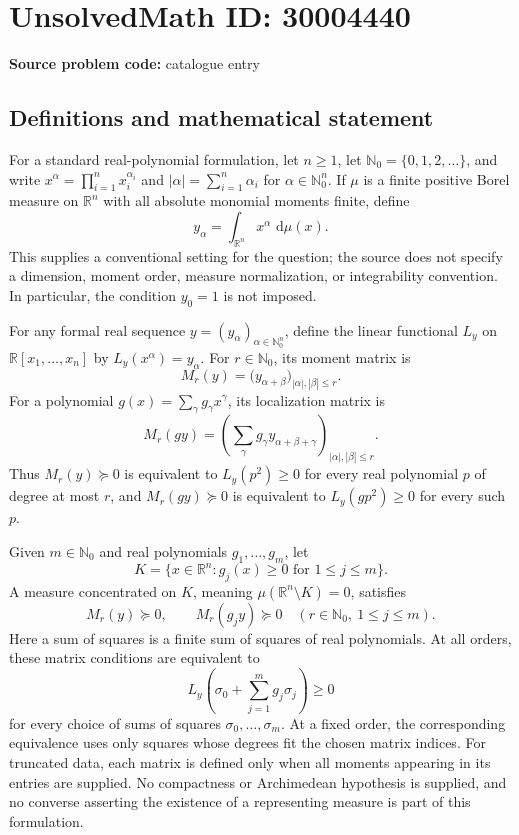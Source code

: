 \documentclass[11pt]{article}
\newcommand{\N}{\mathbb{N}}
\newcommand{\R}{\mathbb{R}}
\newcommand{\dd}{\,\mathrm{d}}
\begin{document}
\section*{UnsolvedMath ID: 30004440}
\textbf{Source problem code:} catalogue entry
\subsection{Definitions and mathematical statement}
For a standard real-polynomial formulation, let \(n\geq 1\), let \(\N_0=\{0,1,2,\ldots\}\), and write \(x^\alpha=\prod_{i=1}^n x_i^{\alpha_i}\) and \(|\alpha|=\sum_{i=1}^n\alpha_i\) for \(\alpha\in\N_0^n\). If \(\mu\) is a finite positive Borel measure on \(\R^n\) with all absolute monomial moments finite, define
\[
y_\alpha=\int_{\R^n}x^\alpha\,\dd\mu(x).
\]
This supplies a conventional setting for the question; the source does not specify a dimension, moment order, measure normalization, or integrability convention. In particular, the condition \(y_0=1\) is not imposed.

For any formal real sequence \(y=(y_\alpha)_{\alpha\in\N_0^n}\), define the linear functional \(L_y\) on \(\R[x_1,\ldots,x_n]\) by \(L_y(x^\alpha)=y_\alpha\). For \(r\in\N_0\), its moment matrix is
\[
M_r(y)=\bigl(y_{\alpha+\beta}\bigr)_{|\alpha|,|\beta|\leq r}.
\]
For a polynomial \(g(x)=\sum_\gamma g_\gamma x^\gamma\), its localization matrix is
\[
M_r(g y)=\left(\sum_\gamma g_\gamma y_{\alpha+\beta+\gamma}\right)_{|\alpha|,|\beta|\leq r}.
\]
Thus \(M_r(y)\succeq0\) is equivalent to \(L_y(p^2)\geq0\) for every real polynomial \(p\) of degree at most \(r\), and \(M_r(g y)\succeq0\) is equivalent to \(L_y(gp^2)\geq0\) for every such \(p\).

Given \(m\in\N_0\) and real polynomials \(g_1,\ldots,g_m\), let
\[
K=\{x\in\R^n:g_j(x)\geq0\text{ for }1\leq j\leq m\}.
\]
A measure concentrated on \(K\), meaning \(\mu(\R^n\setminus K)=0\), satisfies
\[
M_r(y)\succeq0,\qquad M_r(g_jy)\succeq0
\quad(r\in\N_0,\ 1\leq j\leq m).
\]
Here a sum of squares is a finite sum of squares of real polynomials. At all orders, these matrix conditions are equivalent to
\[
L_y\!\left(\sigma_0+\sum_{j=1}^m g_j\sigma_j\right)\geq0
\]
for every choice of sums of squares \(\sigma_0,\ldots,\sigma_m\). At a fixed order, the corresponding equivalence uses only squares whose degrees fit the chosen matrix indices. For truncated data, each matrix is defined only when all moments appearing in its entries are supplied. No compactness or Archimedean hypothesis is supplied, and no converse asserting the existence of a representing measure is part of this formulation.
\end{document}
